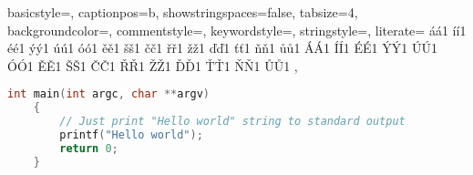 \usepackage{color}


\usepackage{listings}
\lstset
{
	basicstyle=\footnotesize,      %
	captionpos=b,                  %
	showstringspaces=false,        %
	tabsize=4,                     %
	backgroundcolor=\color{white}, %
	commentstyle=\color{mygreen},  %
	keywordstyle=\color{blue},     %
	stringstyle=\color{mymauve},   %
	literate=%
		{á}{{\'a}}1     {í}{{\'i}}1     {é}{{\'e}}1
		{ý}{{\'y}}1     {ú}{{\'u}}1     {ó}{{\'o}}1
		{ě}{{\v{e}}}1   {š}{{\v{s}}}1   {č}{{\v{c}}}1
		{ř}{{\v{r}}}1   {ž}{{\v{z}}}1   {ď}{{\v{d}}}1
		{ť}{{\v{t}}}1   {ň}{{\v{n}}}1   {ů}{{\r{u}}}1
		{Á}{{\'A}}1     {Í}{{\'I}}1     {É}{{\'E}}1
		{Ý}{{\'Y}}1     {Ú}{{\'U}}1     {Ó}{{\'O}}1
		{Ě}{{\v{E}}}1   {Š}{{\v{S}}}1   {Č}{{\v{C}}}1
		{Ř}{{\v{R}}}1   {Ž}{{\v{Z}}}1   {Ď}{{\v{D}}}1
		{Ť}{{\v{T}}}1   {Ň}{{\v{N}}}1   {Ů}{{\r{U}}}1
	,
}



	\begin{lstlisting}[language=C, gobble=8]
	int main(int argc, char **argv)
	{
		// Just print "Hello world" string to standard output
		printf("Hello world");
		return 0;
	}
	\end{lstlisting}


